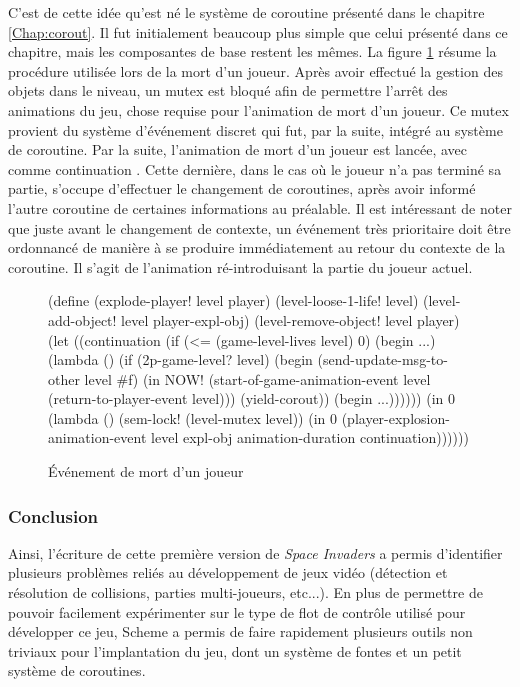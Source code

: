 \documentclass[12pt,oneside,letterpaper,francais]{book}
\newcommand{\si}{{\textit{Space Invaders }}}
\newcommand{\scheme}[1]{\selectlanguage{english}{\tt #1}\selectlanguage{french}}
\begin{document}
C'est de cette idée qu'est né le système de coroutine présenté dans le
chapitre \ref{Chap:corout}. Il fut initialement beaucoup plus simple
que celui présenté dans ce chapitre, mais les composantes de base
restent les mêmes. La figure \ref{Exp:si-mort} résume la procédure
utilisée lors de la mort d'un joueur. Après avoir effectué la gestion
des objets dans le niveau, un mutex est bloqué afin de permettre
l'arrêt des animations du jeu, chose requise pour l'animation de mort
d'un joueur. Ce mutex provient du système d'événement discret qui fut,
par la suite, intégré au système de coroutine. Par la suite,
l'animation de mort d'un joueur est lancée, avec comme continuation
\scheme{continuation}. Cette dernière, dans le cas où le joueur n'a
pas terminé sa partie, s'occupe d'effectuer le changement de
coroutines, après avoir informé l'autre coroutine de certaines
informations au préalable. Il est intéressant de noter que juste avant
le changement de contexte, un événement très prioritaire doit être
ordonnancé de manière à se produire immédiatement au retour du
contexte de la coroutine. Il s'agit de l'animation ré-introduisant la
partie du joueur actuel.

\begin{figure}[htb!]
  \begin{schemecode}
(define (explode-player! level player)
  (level-loose-1-life! level)
  (level-add-object! level player-expl-obj)
  (level-remove-object! level player)
  (let ((continuation
         (if (<= (game-level-lives level) 0)
             (begin ...)
             (lambda ()
               (if (2p-game-level? level)
                   (begin
                     (send-update-msg-to-other level \#f)
                     (in NOW! (start-of-game-animation-event
                               level (return-to-player-event level)))
                     (yield-corout))
                   (begin ...))))))
     (in 0 (lambda ()
            (sem-lock! (level-mutex level))
            (in 0 (player-explosion-animation-event
                   level expl-obj animation-duration continuation))))))
   \end{schemecode}
  \caption{Événement de mort d'un joueur}
  \label{Exp:si-mort}
\end{figure}

\subsubsection{Conclusion}

Ainsi, l'écriture de cette première version de \si a permis
d'identifier plusieurs problèmes reliés au développement de jeux vidéo
(détection et résolution de collisions, parties multi-joueurs,
etc...). En plus de permettre de pouvoir facilement expérimenter sur
le type de flot de contrôle utilisé pour développer ce jeu, Scheme a
permis de faire rapidement plusieurs outils non triviaux pour
l'implantation du jeu, dont un système de fontes et un petit système
de coroutines.
\end{document}
